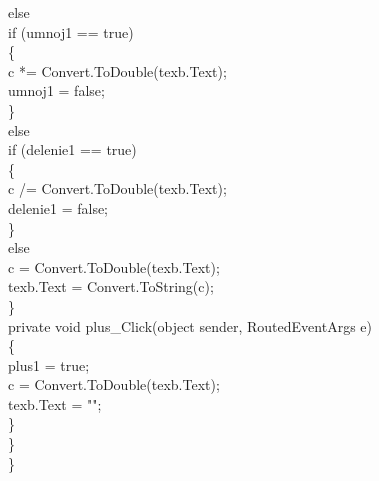             else\\
            if (umnoj1 == true)\\
            \{\\
                c *= Convert.ToDouble(texb.Text);\\
                umnoj1 = false;\\
            \}\\

            else\\
            if (delenie1 == true)\\
            \{\\
                c /= Convert.ToDouble(texb.Text);\\
                delenie1 = false;\\
            \}\\

            else\\
                c = Convert.ToDouble(texb.Text);\\

            texb.Text = Convert.ToString(c);\\              
        \}\\

        private void plus\_Click(object sender, RoutedEventArgs e)\\
        \{\\
            plus1 = true;\\
            c = Convert.ToDouble(texb.Text);\\
            texb.Text = "";\\

        \}\\
    \}\\
\}\\


